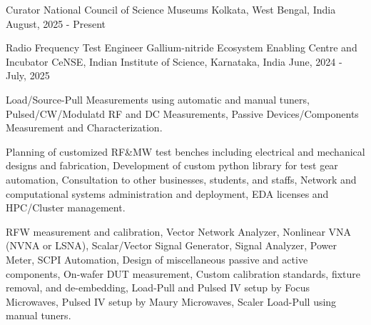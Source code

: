

\begin{cventries}
\cventry
{Curator} %
{National Council of Science Museums} %
{Kolkata, West Bengal, India} %
{August, 2025 - Present} %
{
}


  \cventry
    {Radio Frequency Test Engineer} %
    {Gallium-nitride Ecosystem Enabling Centre and Incubator} %
    {CeNSE, Indian Institute of Science, Karnataka, India} %
    {June, 2024 - July, 2025} %
    {
      \begin{cvitems} %
        \item { Load/Source-Pull Measurements using automatic and manual tuners, Pulsed/CW/Modulatd RF and DC Measurements, Passive Devices/Components Measurement and Characterization.}
        \item { Planning of customized RF\&MW test benches including electrical and mechanical designs and fabrication, Development of custom python library for test gear automation, Consultation to other businesses, students, and staffs, Network and computational systems administration and deployment, EDA licenses and HPC/Cluster management.}
        \item { RF{\textmu}W measurement and calibration, Vector Network Analyzer, Nonlinear VNA (NVNA or LSNA), Scalar/Vector Signal Generator, Signal Analyzer, Power Meter, SCPI Automation, Design of miscellaneous passive and active components, On-wafer DUT measurement, Custom calibration standards, fixture removal, and de-embedding, Load-Pull and Pulsed IV setup by Focus Microwaves, Pulsed IV setup by Maury Microwaves, Scaler Load-Pull using manual tuners.}
      \end{cvitems}
    }

\end{cventries}